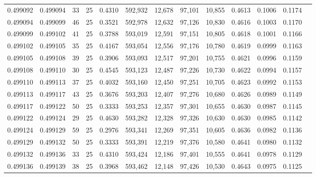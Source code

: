 \begin{tabular}{rrrrrrrrrrrrr}
0.499092 & 0.499094 &    33 &  25 &                                     0.4310 & 592,932 &  12,678 &  97,101 &  10,855 & 0.4613 & 0.1006 & 0.1174 \\
0.499094 & 0.499099 &    46 &  25 &                                     0.3521 & 592,978 &  12,632 &  97,126 &  10,830 & 0.4616 & 0.1003 & 0.1170 \\
0.499099 & 0.499102 &    41 &  25 &                                     0.3788 & 593,019 &  12,591 &  97,151 &  10,805 & 0.4618 & 0.1001 & 0.1166 \\
0.499102 & 0.499105 &    35 &  25 &                                     0.4167 & 593,054 &  12,556 &  97,176 &  10,780 & 0.4619 & 0.0999 & 0.1163 \\
0.499105 & 0.499108 &    39 &  25 &                                     0.3906 & 593,093 &  12,517 &  97,201 &  10,755 & 0.4621 & 0.0996 & 0.1159 \\
0.499108 & 0.499110 &    30 &  25 &                                     0.4545 & 593,123 &  12,487 &  97,226 &  10,730 & 0.4622 & 0.0994 & 0.1157 \\
0.499110 & 0.499113 &    37 &  25 &                                     0.4032 & 593,160 &  12,450 &  97,251 &  10,705 & 0.4623 & 0.0992 & 0.1153 \\
0.499113 & 0.499117 &    43 &  25 &                                     0.3676 & 593,203 &  12,407 &  97,276 &  10,680 & 0.4626 & 0.0989 & 0.1149 \\
0.499117 & 0.499122 &    50 &  25 &                                     0.3333 & 593,253 &  12,357 &  97,301 &  10,655 & 0.4630 & 0.0987 & 0.1145 \\
0.499122 & 0.499124 &    29 &  25 &                                     0.4630 & 593,282 &  12,328 &  97,326 &  10,630 & 0.4630 & 0.0985 & 0.1142 \\
0.499124 & 0.499129 &    59 &  25 &                                     0.2976 & 593,341 &  12,269 &  97,351 &  10,605 & 0.4636 & 0.0982 & 0.1136 \\
0.499129 & 0.499132 &    50 &  25 &                                     0.3333 & 593,391 &  12,219 &  97,376 &  10,580 & 0.4641 & 0.0980 & 0.1132 \\
0.499132 & 0.499136 &    33 &  25 &                                     0.4310 & 593,424 &  12,186 &  97,401 &  10,555 & 0.4641 & 0.0978 & 0.1129 \\
0.499136 & 0.499139 &    38 &  25 &                                     0.3968 & 593,462 &  12,148 &  97,426 &  10,530 & 0.4643 & 0.0975 & 0.1125 \\

\end{tabular}
